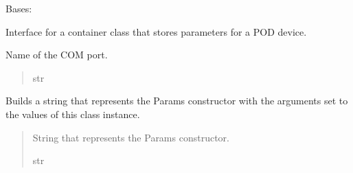 \documentclass[letterpaper,10pt,english]{sphinxmanual}
\begin{document}
\begin{fulllineitems}
\label{\detokenize{PodApi.Parameters:PodApi.Parameters.ParamsBasic.Params}}
\pysigstartsignatures
{}
\pysigstopsignatures
\sphinxAtStartPar
Bases: 

\sphinxAtStartPar
Interface for a container class that stores parameters for a POD device.

\begin{fulllineitems}
\label{\detokenize{PodApi.Parameters:PodApi.Parameters.ParamsBasic.Params.port}}
\pysigstartsignatures
{}
\pysigstopsignatures
\sphinxAtStartPar
Name of the COM port.
\begin{quote}\begin{description}
\sphinxAtStartPar
str

\end{description}\end{quote}

\end{fulllineitems}


\begin{fulllineitems}
\label{\detokenize{PodApi.Parameters:PodApi.Parameters.ParamsBasic.Params.GetInit}}
\pysigstartsignatures
{}
\pysigstopsignatures
\sphinxAtStartPar
Builds a string that represents the Params constructor with the         arguments set to the values of this class instance.
\begin{quote}\begin{description}
\sphinxAtStartPar
String that represents the Params constructor.

\sphinxAtStartPar
str


\end{description}
\end{quote}
\end{fulllineitems}
\end{fulllineitems}
\end{document}
